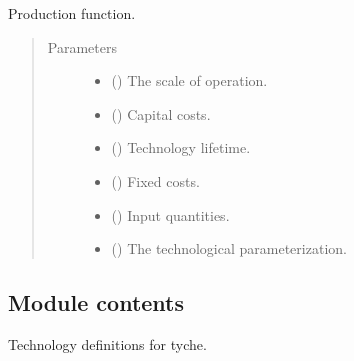 \documentclass[letterpaper,10pt,english]{sphinxmanual}
\begin{document}
\begin{fulllineitems}
\label{\detokenize{doc-src/technology:technology.utility_pv.production}}
Production function.
\begin{quote}\begin{description}
\item[{Parameters}] \leavevmode\begin{itemize}
\item {} 
 () \textendash{} The scale of operation.

\item {} 
 () \textendash{} Capital costs.

\item {} 
 () \textendash{} Technology lifetime.

\item {} 
 () \textendash{} Fixed costs.

\item {} 
 () \textendash{} Input quantities.

\item {} 
 () \textendash{} The technological parameterization.

\end{itemize}

\end{description}\end{quote}

\end{fulllineitems}



\subsection{Module contents}
\label{\detokenize{doc-src/technology:module-technology}}\label{\detokenize{doc-src/technology:module-contents}}
Technology definitions for tyche.
\end{document}
